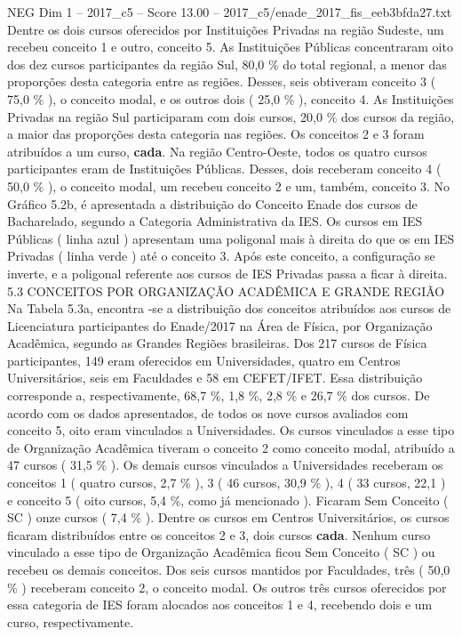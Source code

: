 \begin{textsample}{NEG Dim 1 – 2017\_c5 – Score 13.00 – 2017\_c5/enade\_2017\_fis\_eeb3bfda27.txt}
Dentre os dois cursos oferecidos por Instituições Privadas na região Sudeste, um recebeu conceito 1 e outro, conceito 5.
As Instituições Públicas concentraram oito dos dez cursos participantes da região Sul, 80,0 \% do total regional, a menor das proporções desta categoria entre as regiões.
Desses, seis obtiveram conceito 3 ( 75,0 \% ), o conceito modal, e os outros dois ( 25,0 \% ), conceito 4.
As Instituições Privadas na região Sul participaram com dois cursos, 20,0 \% dos cursos da região, a maior das proporções desta categoria nas regiões.
Os conceitos 2 e 3 foram atribuídos a um curso, \textbf{cada}.
Na região Centro-Oeste, todos os quatro cursos participantes eram de Instituições Públicas.
Desses, dois receberam conceito 4 ( 50,0 \% ), o conceito modal, um recebeu conceito 2 e um, também, conceito 3.
No Gráfico 5.2b, é apresentada a distribuição do Conceito Enade dos cursos de Bacharelado, segundo a Categoria Administrativa da IES.
Os cursos em IES Públicas ( linha azul ) apresentam uma poligonal mais à direita do que os em IES Privadas ( linha verde ) até o conceito 3.
Após este conceito, a configuração se inverte, e a poligonal referente aos cursos de IES Privadas passa a ficar à direita. 5.3 CONCEITOS POR ORGANIZAÇÃO ACADÊMICA E GRANDE REGIÃO Na Tabela 5.3a, encontra -se a distribuição dos conceitos atribuídos aos cursos de Licenciatura participantes do Enade/2017 na Área de Física, por Organização Acadêmica, segundo as Grandes Regiões brasileiras.
Dos 217 cursos de Física participantes, 149 eram oferecidos em Universidades, quatro em Centros Universitários, seis em Faculdades e 58 em CEFET/IFET.
Essa distribuição corresponde a, respectivamente, 68,7 \%, 1,8 \%, 2,8 \% e 26,7 \% dos cursos.
De acordo com os dados apresentados, de todos os nove cursos avaliados com conceito 5, oito eram vinculados a Universidades.
Os cursos vinculados a esse tipo de Organização Acadêmica tiveram o conceito 2 como conceito modal, atribuído a 47 cursos ( 31,5 \% ).
Os demais cursos vinculados a Universidades receberam os conceitos 1 ( quatro cursos, 2,7 \% ), 3 ( 46 cursos, 30,9 \% ), 4 ( 33 cursos, 22,1 ) e conceito 5 ( oito cursos, 5,4 \%, como já mencionado ).
Ficaram Sem Conceito ( SC ) onze cursos ( 7,4 \% ).
Dentre os cursos em Centros Universitários, os cursos ficaram distribuídos entre os conceitos 2 e 3, dois cursos \textbf{cada}.
Nenhum curso vinculado a esse tipo de Organização Acadêmica ficou Sem Conceito ( SC ) ou recebeu os demais conceitos.
Dos seis cursos mantidos por Faculdades, três ( 50,0 \% ) receberam conceito 2, o conceito modal.
Os outros três cursos oferecidos por essa categoria de IES foram alocados aos conceitos 1 e 4, recebendo dois e um curso, respectivamente.

\end{textsample}
